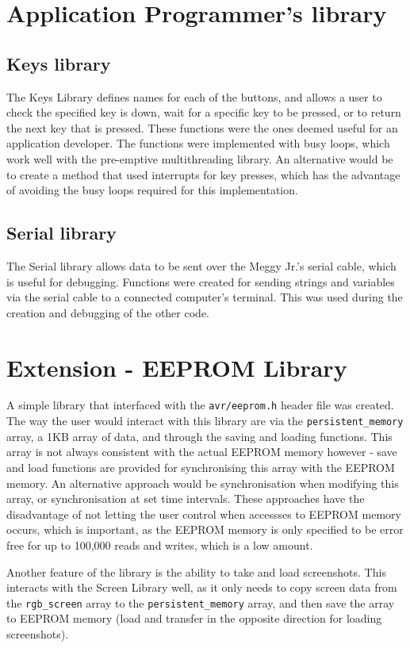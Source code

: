 \documentclass[a4paper]{article}
\begin{document}
\section*{Application Programmer's library}
\subsection*{Keys library}
The Keys Library defines names for each of the buttons, and allows a user to check the specified key is down, wait for a specific key to be pressed, or to return the next key that is pressed. These functions were the ones deemed useful for an application developer.  The functions were implemented with busy loops, which work well with the pre-emptive multithreading library. An alternative would be to create a method that used interrupts for key presses, which has the advantage of avoiding the busy loops required for this implementation.
\subsection*{Serial library}
The Serial library allows data to be sent over the Meggy Jr.'s serial cable, which is useful for debugging. Functions were created for sending strings and variables via the serial cable to a connected computer's terminal. This was used during the creation and debugging of the other code.

\section*{Extension - EEPROM Library}
A simple library that interfaced with the \texttt{avr/eeprom.h} header file was created. The way the user would interact with this library are via the \texttt{persistent\_memory} array, a 1KB array of data, and through the saving and loading functions. This array is not always consistent with the actual EEPROM memory however - save and load functions are provided for synchronising this array with the EEPROM memory. An alternative approach would be synchronisation when modifying this array, or synchronisation at set time intervals. These approaches have the disadvantage of not letting the user control when accessses to EEPROM memory occurs, which is important, as the EEPROM memory is only specified to be error free for up to 100,000 reads and writes, which is a low amount.

Another feature of the library is the ability to take and load screenshots. This interacts with the Screen Library well, as it only needs to copy screen data from the \texttt{rgb\_screen} array to the \texttt{persistent\_memory} array, and then save the array to EEPROM memory (load and transfer in the opposite direction for loading screenshots).
\end{document}
